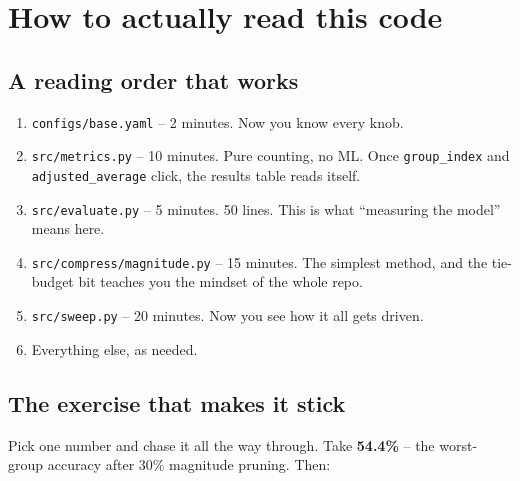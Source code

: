 \documentclass[11pt]{article}
\newcommand{\f}[1]{\textcolor{accent}{\texttt{#1}}}
\newcommand{\code}[1]{\texttt{\small #1}}
\begin{document}
\section{How to actually read this code}

\subsection{A reading order that works}

\begin{enumerate}[leftmargin=1.6em]
\item \f{configs/base.yaml} -- 2 minutes. Now you know every knob.
\item \f{src/metrics.py} -- 10 minutes. Pure counting, no ML. Once
\code{group\_index} and \code{adjusted\_average} click, the results table reads
itself.
\item \f{src/evaluate.py} -- 5 minutes. 50 lines. This is what ``measuring the
model'' means here.
\item \f{src/compress/magnitude.py} -- 15 minutes. The simplest method, and the
tie-budget bit teaches you the mindset of the whole repo.
\item \f{src/sweep.py} -- 20 minutes. Now you see how it all gets driven.
\item Everything else, as needed.
\end{enumerate}

\subsection{The exercise that makes it stick}

Pick one number and chase it all the way through. Take \textbf{54.4\%} -- the
worst-group accuracy after 30\% magnitude pruning. Then:

\begin{center}
\end{center}
\end{document}
